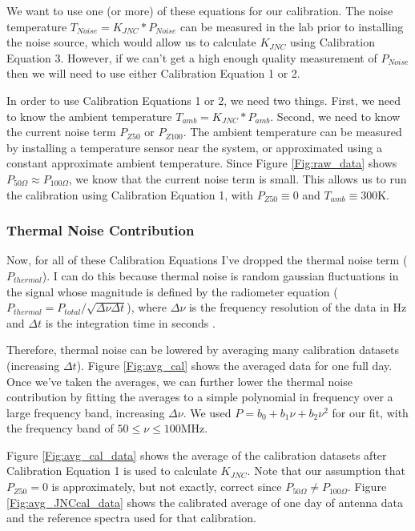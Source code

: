 We want to use one (or more) of these equations for our calibration. The noise temperature $T_{Noise}= K_{JNC}*P_{Noise}$ can be measured in the lab prior to installing the noise source, which would allow us to calculate $K_{JNC}$ using Calibration Equation 3. However, if we can't get a high enough quality measurement of $P_{Noise}$ then we will need to use either Calibration Equation 1 or 2. 

In order to use Calibration Equations 1 or 2, we need two things. First, we need to know the ambient temperature $T_{amb} = K_{JNC}*P_{amb}$. Second, we need to know the current noise term $P_{Z50}$ or $P_{Z100}$. The ambient temperature can be measured by installing a temperature sensor near the system, or approximated using a constant approximate ambient temperature. Since Figure \ref{Fig:raw_data} shows $P_{50 \Omega} \approx P_{100 \Omega}$, we know that the current noise term is small. This allows us to run the calibration using Calibration Equation 1, with $P_{Z50} \equiv 0$ and $T_{amb} \equiv 300$K. 

\subsubsection{Thermal Noise Contribution}
Now, for all of these Calibration Equations I've dropped the thermal noise term ($P_{thermal}$). I can do this because thermal noise is random gaussian fluctuations in the signal whose magnitude is defined by the radiometer equation ($P_{thermal} = P_{total}/\sqrt{\Delta \nu \Delta t}$), where $\Delta \nu$ is the frequency resolution of the data in Hz and $\Delta t$ is the integration time in seconds \cite{stutzman1981}. 

Therefore, thermal noise can be lowered by averaging many calibration datasets (increasing $\Delta t$). Figure \ref{Fig:avg_cal} shows the averaged data for one full day. Once we've taken the averages, we can further lower the thermal noise contribution by fitting the averages to a simple polynomial in frequency over a large frequency band, increasing $\Delta \nu$. We used $P = b_0 + b_1 \nu +b_2 \nu^2$ for our fit, with the frequency band of $50 \leq \nu \leq 100$MHz. 

Figure \ref{Fig:avg_cal_data} shows the average of the calibration datasets after Calibration Equation 1 is used to calculate $K_{JNC}$. Note that our assumption that $P_{Z50}=0$ is approximately, but not exactly, correct since $P_{50 \Omega} \neq P_{100 \Omega}$. Figure \ref{Fig:avg_JNCcal_data} shows the calibrated average of one day of antenna data and the reference spectra used for that calibration. 

